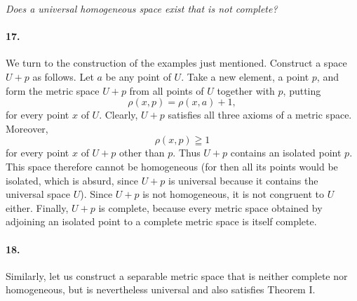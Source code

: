 \documentclass[a4paper,12pt]{amsart}
\begin{document}
\textit{Does a universal homogeneous space exist that is not complete?}

\paragraph{17.}
We turn to the construction of the examples just mentioned. Construct a space $U+p$ as follows. Let $a$ be any point of $U$. Take a new element, a point $p$, and form the metric space $U+p$ from all points of $U$ together with $p$, putting
\[
\rho(x,p)=\rho(x,a)+1,
\]
for every point $x$ of $U$. Clearly, $U+p$ satisfies all three axioms of a metric space. Moreover,
\[
\rho(x,p)\geqq1
\]
for every point $x$ of $U+p$ other than $p$. Thus $U+p$ contains an isolated point $p$. This space therefore cannot be homogeneous (for then all its points would be isolated, which is absurd, since $U+p$ is universal because it contains the universal space $U$). Since $U+p$ is not homogeneous, it is not congruent to $U$ either. Finally, $U+p$ is complete, because every metric space obtained by adjoining an isolated point to a complete metric space is itself complete.

\paragraph{18.}
Similarly, let us construct a separable metric space that is neither complete nor homogeneous, but is nevertheless universal and also satisfies Theorem I.
\end{document}
